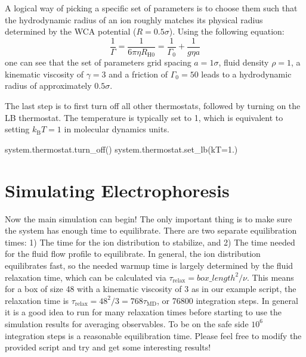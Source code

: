 \documentclass[
paper=a4,                       %
fontsize=11pt,                  %
twoside,                        %
footsepline,                    %
headsepline,                    %
headinclude=false,              %
footinclude=false,              %
pagesize,                       %
]{scrartcl}
\begin{document}
A logical way of picking a specific set of parameters is to choose them such that the hydrodynamic radius of an ion roughly matches its physical radius determined by the
WCA potential ($R=0.5\sigma$). Using the following equation:
\begin{equation}
\frac{1}{\Gamma}=\frac{1}{6\pi \eta R_{\mathrm{H0}}}=\frac{1}{\Gamma_0} 
+\frac{1}{g\eta a} 
 \label{effectiveGammaEq}
\end{equation}
one can see that the set of parameters grid spacing $a=1\sigma$, fluid density $\rho=1$, a 
kinematic viscosity of $\gamma=3 $ and a friction of $\Gamma_0=50$ leads to a hydrodynamic radius
of approximately $0.5\sigma$.

The last step is to first turn off all other thermostats, followed by turning on the LB thermostat. The temperature is typically set to 1, which is equivalent to setting
$k_\mathrm{B}T=1$ in molecular dynamics units.

{\small\vspace{0,2cm}
\begin{pypresso}[numbers=none]
system.thermostat.turn_off()
system.thermostat.set_lb(kT=1.)
\end{pypresso}
}

\section{Simulating Electrophoresis}
Now the main simulation can begin! The only important thing is to make sure the system has enough time to equilibrate. There are two separate equilibration times: 1) The time for the ion distribution to stabilize, and 2) The time
needed for the fluid flow profile to equilibrate. In general, the ion distribution equilibrates fast, so the needed warmup time is largely determined by the fluid relaxation time, which can be calculated via $\tau_\mathrm{relax} = box\_length^2/\nu$. This means for a box of size 48 with a kinematic viscosity of 3 as in our example script, the relaxation time is $\tau_\mathrm{relax} = 48^2/3 = 768 \tau_\mathrm{MD}$, or 76800 integration steps. In general it is a good idea to run for many relaxation times before starting to use the simulation results for averaging observables. To be on the safe side $10^6$ integration steps is a reasonable equilibration time. Please feel free to modify the provided script and try and get some interesting results!
\end{document}
